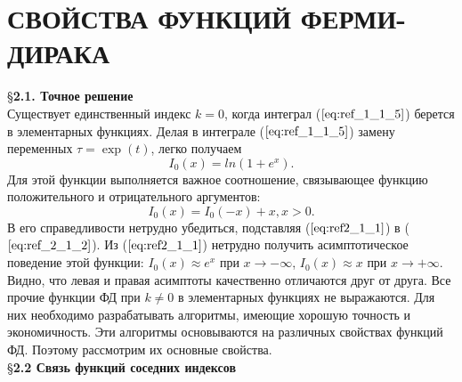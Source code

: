 \chapter{СВОЙСТВА ФУНКЦИЙ ФЕРМИ-ДИРАКА}
\indent \S \textbf{2.1. Точное решение }
\\

Существует единственный индекс $k = 0$, когда интеграл ($\ref{eq:ref_1_1_5}$) берется в элементарных функциях. Делая в интеграле ($\ref{eq:ref_1_1_5}$) замену переменных $\tau = \exp{(t)}$, легко получаем
\begin{equation}
I_0(x) = ln(1+e^{x}).
\label{eq:ref2_1_1}
\end{equation}
Для этой функции выполняется важное соотношение, связывающее функцию положительного и отрицательного аргументов:
\begin{equation}
I_0(x) = I_0(-x) + x, x > 0.
\label{eq:ref_2_1_2}
\end{equation}
В его справедливости нетрудно убедиться, подставляя ($\ref{eq:ref2_1_1}$) в ($\ref{eq:ref_2_1_2}$).
\newline
\indent
Из ($\ref{eq:ref2_1_1}$) нетрудно получить асимптотическое поведение этой функции: $I_0(x) \approx e^{x}$ при $ x \to -\infty$, $I_0(x) \approx x$ при $x \to +\infty$. Видно, что левая и правая асимптоты качественно отличаются друг от друга.
\newline
\indent
Все прочие функции ФД при $k \neq 0$ в элементарных функциях не выражаются. Для них необходимо разрабатывать алгоритмы, имеющие хорошую точность и экономичность. Эти алгоритмы основываются на различных свойствах функций ФД. Поэтому рассмотрим их основные свойства.
\\

\S \textbf{2.2 Связь функций соседних индексов}
\\

